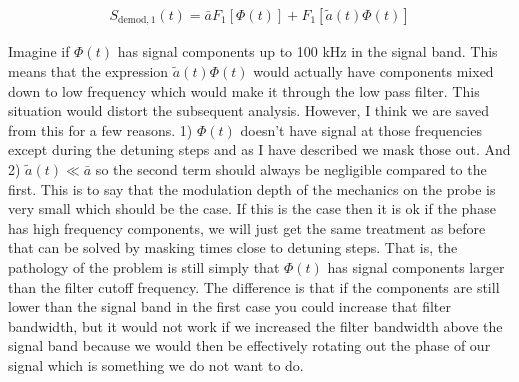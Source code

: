 \documentclass[12pt]{article}
\begin{document}
\begin{align}
S_{\text{demod},1}(t) = \bar{a}F_1\left[\Phi(t)\right] + F_1\left[\tilde{a}(t)\Phi(t) \right]
\end{align}

Imagine if $\Phi(t)$ has signal components up to 100 kHz in the signal band. This means that the expression $\tilde{a}(t)\Phi(t)$ would actually have components mixed down to low frequency which would make it through the low pass filter. This situation would distort the subsequent analysis. However, I think we are saved from this for a few reasons. 1) $\Phi(t)$ doesn't have signal at those frequencies except during the detuning steps and as I have described we mask those out. And 2) $\tilde{a}(t) \ll \bar{a}$ so the second term should always be negligible compared to the first. This is to say that the modulation depth of the mechanics on the probe is very small which should be the case. If this is the case then it is ok if the phase has high frequency components, we will just get the same treatment as before that can be solved by masking times close to detuning steps. That is, the pathology of the problem is still simply that $\Phi(t)$ has signal components larger than the filter cutoff frequency. The difference is that if the components are still lower than the signal band in the first case you could increase that filter bandwidth, but it would not work if we increased the filter bandwidth above the signal band because we would then be effectively rotating out the phase of our signal which is something we do not want to do.
\end{document}
